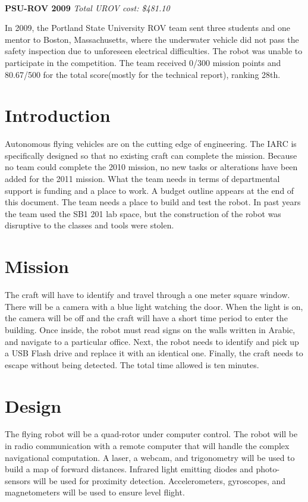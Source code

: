 \documentclass{article}
\begin{document}
\ \\
\noindent
{\bf PSU-ROV 2009}
{\it Total UROV cost: \$481.10}

In 2009, the Portland State University ROV team sent three students and one mentor to Boston, Massachusetts, where the underwater vehicle did not pass the safety inspection due to unforeseen electrical difficulties. The robot was unable to participate in the competition. The team received 0/300 mission points and 80.67/500 for the total score(mostly for the technical report), ranking 28th. 


\section{Introduction}

Autonomous flying vehicles are on the cutting edge of engineering. The IARC is specifically designed so that no existing craft can complete the mission. Because no team could complete the 2010 mission, no new tasks or alterations have been added for the 2011 mission. What the team needs in terms of departmental support is funding and a place to work. A budget outline appears at the end of this document. The team needs a place to build and test the robot. In past years the team used the SB1 201 lab space, but the construction of the robot was disruptive to the classes and tools were stolen. 

\section{Mission}

The craft will have to identify and travel through a one meter square window. There will be a camera with a blue light watching the door. When the light is on, the camera will be off and the craft will have a short time period to enter the building. Once inside, the robot must read signs on the walls written in Arabic, and navigate to a particular office. Next, the robot needs to identify and pick up a USB Flash drive and replace it with an identical one. Finally, the craft needs to escape without being detected. The total time allowed is ten minutes. 
\section{Design}

The flying robot will be a quad-rotor under computer control. The robot will be in radio communication with a remote computer that will handle the complex navigational computation. A laser, a webcam, and trigonometry will be used to build a map of forward distances. Infrared light emitting diodes and photo-sensors will be used for proximity detection. Accelerometers, gyroscopes, and magnetometers will be used to ensure level flight. 
\end{document}
